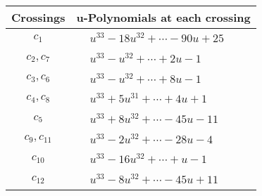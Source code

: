 \documentclass[1p]{elsarticle_modified}
\theoremstyle{definition}
\begin{document}
\begin{tabular}{m{50pt}|m{274pt}}
Crossings & \hspace{64pt}u-Polynomials at each crossing \\
\hline $$\begin{aligned}c_{1}\end{aligned}$$&$\begin{aligned}
&u^{33}-18 u^{32}+\cdots-90 u+25
\end{aligned}$\\
\hline $$\begin{aligned}c_{2},c_{7}\end{aligned}$$&$\begin{aligned}
&u^{33}- u^{32}+\cdots+2 u-1
\end{aligned}$\\
\hline $$\begin{aligned}c_{3},c_{6}\end{aligned}$$&$\begin{aligned}
&u^{33}- u^{32}+\cdots+8 u-1
\end{aligned}$\\
\hline $$\begin{aligned}c_{4},c_{8}\end{aligned}$$&$\begin{aligned}
&u^{33}+5 u^{31}+\cdots+4 u+1
\end{aligned}$\\
\hline $$\begin{aligned}c_{5}\end{aligned}$$&$\begin{aligned}
&u^{33}+8 u^{32}+\cdots-45 u-11
\end{aligned}$\\
\hline $$\begin{aligned}c_{9},c_{11}\end{aligned}$$&$\begin{aligned}
&u^{33}-2 u^{32}+\cdots-28 u-4
\end{aligned}$\\
\hline $$\begin{aligned}c_{10}\end{aligned}$$&$\begin{aligned}
&u^{33}-16 u^{32}+\cdots+u-1
\end{aligned}$\\
\hline $$\begin{aligned}c_{12}\end{aligned}$$&$\begin{aligned}
&u^{33}-8 u^{32}+\cdots-45 u+11
\end{aligned}$\\
\hline
\end{tabular}\\~\\
\end{document}
